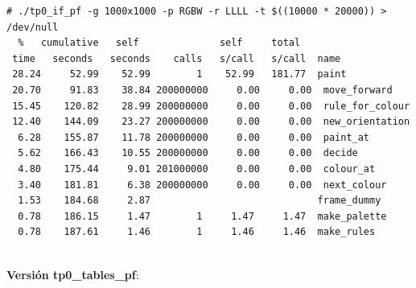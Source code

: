\documentclass[a4paper, 10pt, twoside, notitlepage]{article}
\begin{document}
\begin{verbatim}
# ./tp0_if_pf -g 1000x1000 -p RGBW -r LLLL -t $((10000 * 20000)) > /dev/null
  %   cumulative   self              self     total           
 time   seconds   seconds    calls   s/call   s/call  name    
 28.24     52.99    52.99        1    52.99   181.77  paint
 20.70     91.83    38.84 200000000     0.00     0.00  move_forward
 15.45    120.82    28.99 200000000     0.00     0.00  rule_for_colour
 12.40    144.09    23.27 200000000     0.00     0.00  new_orientation
  6.28    155.87    11.78 200000000     0.00     0.00  paint_at
  5.62    166.43    10.55 200000000     0.00     0.00  decide
  4.80    175.44     9.01 201000000     0.00     0.00  colour_at
  3.40    181.81     6.38 200000000     0.00     0.00  next_colour
  1.53    184.68     2.87                             frame_dummy
  0.78    186.15     1.47        1     1.47     1.47  make_palette
  0.78    187.61     1.46        1     1.46     1.46  make_rules
  

\end{verbatim}
\normalsize

\textbf{Versión tp0\_tables\_pf}:
\end{document}
